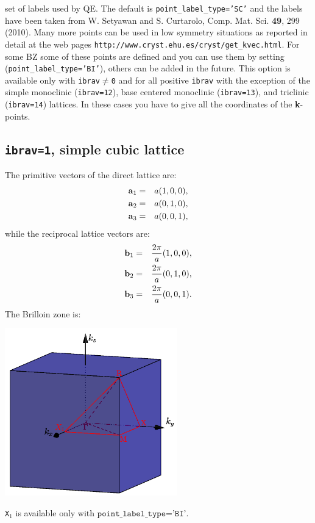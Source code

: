 \documentclass[12pt,a4paper]{article}
\begin{document}
set of labels used by QE. The default is \texttt{point\_label\_type='SC'} and
the labels have been taken from W. Setyawan and S. Curtarolo, Comp. Mat. Sci.
{\bf 49}, 299 (2010). Many more points can be used in low symmetry
situations as reported in detail at the web pages 
\texttt{http://www.cryst.ehu.es/cryst/get\_kvec.html}.
For some BZ some of these points are defined and you can use them by setting
(\texttt{point\_label\_type='BI'}), others can be added in the future.
This option is available only with \texttt{ibrav$\ne$0} and for 
all positive \texttt{ibrav} with the exception of the simple monoclinic
(\texttt{ibrav=12}), base centered monoclinic (\texttt{ibrav=13}), and
triclinic (\texttt{ibrav=14}) lattices. In these cases you have to
give all the coordinates of the {\bf k}-points.

\subsection{\texttt{ibrav=1}, simple cubic lattice}
The primitive vectors of the direct lattice are:
\begin{eqnarray}
{\bf a}_1 &=& a (1, 0, 0), \nonumber \\
{\bf a}_2 &=& a (0, 1, 0), \nonumber \\
{\bf a}_3 &=& a (0, 0, 1), \nonumber
\nonumber
\end{eqnarray}
while the reciprocal lattice vectors are:
\begin{eqnarray}
{\bf b}_1 &=& {2\pi \over a} (1, 0, 0), \nonumber \\
{\bf b}_2 &=& {2\pi \over a} (0, 1, 0), \nonumber \\
{\bf b}_3 &=& {2\pi \over a} (0, 0, 1). \nonumber
\nonumber
\end{eqnarray}
The Brilloin zone is:
\begin{center}
\includegraphics[width=7.5cm,angle=0]{images/cubic_bi.png}
\end{center}
\texttt{X$_1$} is available only with $\texttt{point\_label\_type='BI'}$.
\end{document}
